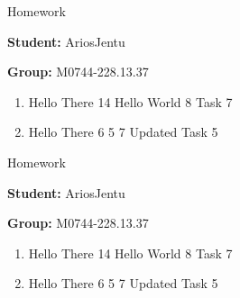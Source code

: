 \documentclass[12pt, fleqn, a4paper]{article}
\newcommand{\preamble}{\lipsum[1]}
\newcommand{\generatepage}[4]{
	\begin{center}
		{\Large #1}

		\textbf{Student:} #2

		\textbf{Group:} #3

	\end{center}

	\vspace{10pt}

	\preamble

	\begin{enumerate}
		#4
	\end{enumerate}

	\pagebreak
}
\begin{document}
	
	\generatepage{Homework}{AriosJentu}{M0744-228.13.37}{
		\item Hello There
			14
			Hello World
			8
			Task 7
		\item Hello There
			6
			5
			7
			Updated Task 5
	}

	\generatepage{Homework}{AriosJentu}{M0744-228.13.37}{
		\item Hello There
			14
			Hello World
			8
			Task 7
		\item Hello There
			6
			5
			7
			Updated Task 5
	}
\end{document}
